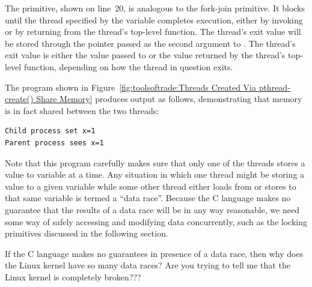 The  primitive, shown on line~20,  is analogous to
the fork-join  primitive.
It blocks until the thread specified by the  variable completes
execution, either by invoking  or by returning from
the thread's top-level function.
The thread's exit value will be stored through the pointer passed as the
second argument to .
The thread's exit value is either the value passed to 
or the value returned by the thread's top-level function, depending on
how the thread in question exits.

The program shown in
Figure~\ref{fig:toolsoftrade:Threads Created Via pthread-create() Share Memory}
produces output as follows, demonstrating that memory is in fact
shared between the two threads:

\vspace{5pt}
\begin{minipage}[t]{\columnwidth}
\scriptsize
\begin{verbatim}
Child process set x=1
Parent process sees x=1
\end{verbatim}
\end{minipage}
\vspace{5pt}

Note that this program carefully makes sure that only one of the threads
stores a value to variable  at a time.
Any situation in which one thread might be storing a value to a given
variable while some other thread either loads from or stores to that
same variable is termed a ``data race''.
Because the C language makes no guarantee that the results of a data race
will be in any way reasonable, we need some way of safely accessing
and modifying data concurrently, such as the locking primitives discussed
in the following section.

\QuickQuiz{}
	If the C language makes no guarantees in presence of a data
	race, then why does the Linux kernel have so many data races?
	Are you trying to tell me that the Linux kernel is completely
	broken???
 \QuickQuizEnd

